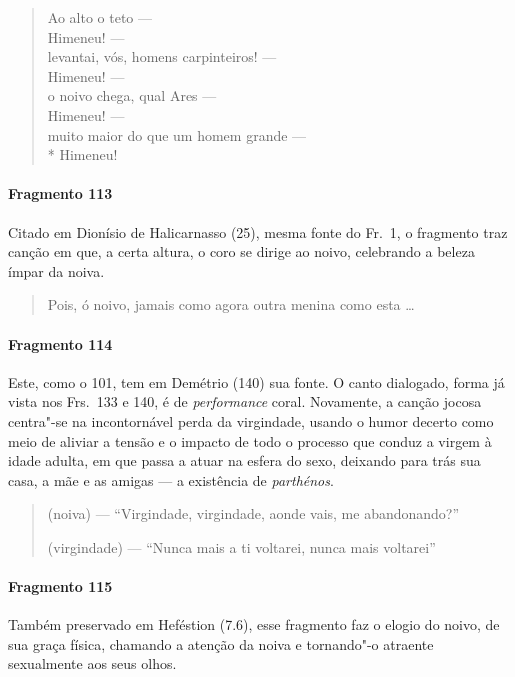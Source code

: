 \begin{verse}
Ao alto o teto --- \\
Himeneu! --- \\
levantai, vós, homens carpinteiros! --- \\
Himeneu! --- \\
o noivo chega, qual Ares --- \\
Himeneu! --- \\
muito maior do que um homem grande ---\\*
Himeneu!
\end{verse}

\paragraph{Fragmento 113}

{\small Citado em Dionísio de Halicarnasso (25), mesma fonte do Fr.~1, o fragmento traz canção em que, a certa altura, o coro se dirige ao noivo, celebrando a beleza ímpar da noiva.}

\begin{verse}
Pois, ó noivo, jamais como agora outra menina como esta \ldots{}
\end{verse}

\paragraph{Fragmento 114}

{\small Este, como o 101, tem em Demétrio (140) sua fonte. O canto dialogado, forma já vista
nos Frs.~133 e 140, é de \textit{performance} coral. Novamente, a canção jocosa
centra"-se na incontornável perda da virgindade, usando o humor decerto como
meio de aliviar a tensão e o impacto de todo o processo que conduz a virgem à
idade adulta, em que passa a atuar na esfera do sexo, deixando para trás sua casa, a mãe e as amigas --- a existência de \textit{parthénos}.}

\begin{verse}
(noiva) --- ``Virgindade, virgindade, aonde vais, me abandonando?''

(virgindade) --- ``Nunca mais a ti voltarei, nunca mais voltarei''
\end{verse}

\paragraph{Fragmento 115}

{\small Também preservado em Heféstion (7.6), esse fragmento faz o elogio do noivo, de sua
graça física, chamando a atenção da noiva e tornando"-o atraente sexualmente aos
seus olhos. }

